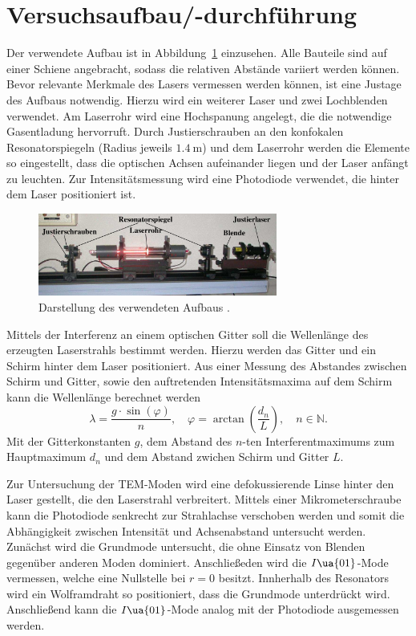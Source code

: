 \section{Versuchsaufbau/-durchführung}
Der verwendete Aufbau ist in Abbildung~\ref{fig: aufbau} einzusehen. Alle Bauteile sind auf einer Schiene angebracht, sodass die
relativen Abstände variiert werden können. Bevor relevante Merkmale des Lasers vermessen werden können, ist eine
Justage des Aufbaus notwendig. Hierzu wird ein weiterer Laser und zwei Lochblenden verwendet. Am Laserrohr wird eine Hochspanung
angelegt, die die notwendige Gasentladung hervorruft. Durch Justierschrauben an den konfokalen Resonatorspiegeln (Radius jeweils $\SI{1.4}{\meter}$)
und dem Laserrohr werden die Elemente so eingestellt, dass die optischen Achsen aufeinander liegen und der Laser anfängt zu leuchten.
Zur Intensitätsmessung wird eine Photodiode verwendet, die hinter dem Laser positioniert ist.
\begin{figure}
  \centering
  \includegraphics[width = 0.7\textwidth]{theorie_bilder/aufbau.png}
  \caption{Darstellung des verwendeten Aufbaus \cite{anleitung61}.}
  \label{fig: aufbau}
\end{figure}

Mittels der Interferenz an einem optischen Gitter soll die Wellenlänge des erzeugten Laserstrahls bestimmt werden. Hierzu werden das Gitter
und ein Schirm hinter dem Laser positioniert. Aus einer Messung des Abstandes zwischen Schirm und Gitter, sowie den auftretenden Intensitätsmaxima
auf dem Schirm kann die Wellenlänge berechnet werden
\begin{equation}
  \lambda = \frac{g \cdot \sin(\varphi)}{n}, \quad \varphi = \arctan\left(\frac{d_n}{L} \right) ,\quad n \in \mathbb{N}.
  \label{eq: interferenz}
\end{equation}
Mit der Gitterkonstanten $g$, dem Abstand des $n$-ten Interferentmaximums zum Hauptmaximum $d_{n}$ und dem Abstand zwichen Schirm und Gitter $L$.

Zur Untersuchung der TEM-Moden wird eine defokussierende Linse hinter den Laser gestellt, die den Laserstrahl verbreitert.
Mittels einer Mikrometerschraube kann die Photodiode
senkrecht zur Strahlachse verschoben werden und somit die Abhängigkeit zwischen Intensität und Achsenabstand untersucht werden. Zunächst
wird die Grundmode untersucht, die ohne Einsatz von Blenden gegenüber anderen Moden dominiert. Anschließeden wird die $I\ua{01}$-Mode
vermessen, welche eine Nullstelle bei $r = 0$ besitzt. Innherhalb des Resonators wird ein Wolframdraht so positioniert, dass die Grundmode
unterdrückt wird. Anschließend kann die $I\ua{01}$-Mode analog mit der Photodiode ausgemessen werden.

